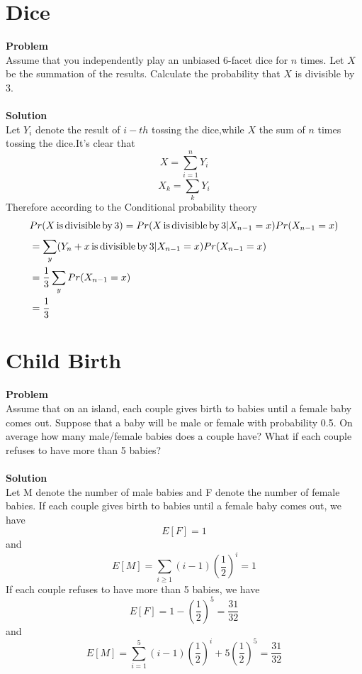	\section{Dice}
	\textbf{Problem}\\
	Assume that you independently play an unbiased 6-facet dice for $n$ times. Let $X$ be the summation of the results. Calculate the probability that $X$ is divisible by 3.\\\\
	\textbf{Solution}\\
	Let $Y_i$ denote the result of $i-th$ tossing the dice,while $X$ the sum of $n$ times tossing the dice.It's clear that\\
	\[X=\sum_{i=1}^{n}Y_i\]
	\[X_k=\sum_{k}^{}Y_i\]
	Therefore according to the Conditional probability theory\\
	\[
		\begin{aligned}
			&Pr(X\, {\rm is\,  divisible \, by\,} 3)=Pr(X\, {\rm is\,  divisible\,  by\,} 3|X_{n-1}=x)Pr(X_{n-1}=x)\\
			&=\sum_{y}^{}(Y_n+x \, {\rm is \, divisible \, \rm by \,} 3|X_{n-1}=x)Pr(X_{n-1}=x)\\
			&=\frac{1}{3}\sum_{y}^{}Pr(X_{n-1}=x)\\
			&=\frac{1}{3}
		\end{aligned}
	\]
	
	\section{Child Birth}
	\textbf{Problem}\\
	Assume that on an island, each couple gives birth to babies until a female baby comes out. Suppose that a baby will be male or female with probability 0.5. On average how many male/female babies does a couple have? What if each couple refuses to have more than 5 babies?\\\\
	\textbf{Solution}\\
	 Let M denote the number of male babies and F denote the number of female babies. If each couple gives birth to babies until a female baby comes out, we have
	 \[
	 E[F]=1
	 \]
	 and
	 \[
	 E[M]=\sum_{i \geq 1}^{}(i-1){\left(\frac{1}{2}\right)}^i=1
	 \]
	 If each couple refuses to have more than 5 babies, we have
	 \[
	 E[F]=1-{\left(\frac{1}{2}\right)}^5=\frac{31}{32}
	 \]
	 and
	 \[
	 E[M]=\sum_{i=1}^{5}(i-1){(\frac{1}{2})}^i+5\left(\frac{1}{2}\right)^5=\frac{31}{32}
	 \]